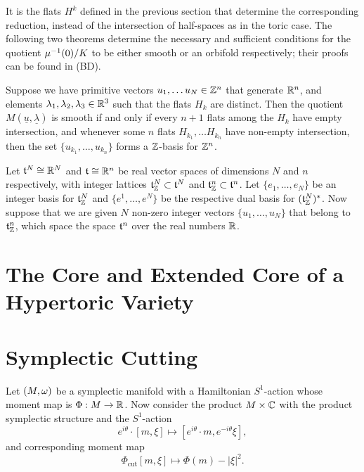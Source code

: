 It is the flats $H^{k}$ defined in the previous section that determine the corresponding \HK reduction, instead of the intersection of half-spaces as in the toric case. The following two theorems determine the necessary and sufficient conditions for the \HK quotient $\mu^{-1}(0)/K$ to be either smooth or an orbifold respectively; their proofs can be found in (BD).

\begin{thm}
	Suppose we have primitive vectors $u_{1},\ldots u_{N} \in \mathbb{Z}^{n}$ that generate $\mathbb{R}^{n}$, and elements $\lambda_{1}, \lambda_{2}, \lambda_{3} \in \mathbb{R}^{3}$ such that the flats $H_{k}$ are distinct. Then the \HK quotient $M(\underline{u},\underline{\lambda})$ is smooth if and only if every $n+1$ flats among the $H_{k}$ have empty intersection, and whenever some $n$ flats $H_{k_{1}}, \ldots H_{k_{n}}$ have non-empty intersection, then the set $\{ u_{k_{1}}, \ldots, u_{k_{n}}  \}$ forms a $\mathbb{Z}$-basis for $\mathbb{Z}^{n}$.
\end{thm}

Let $\mathfrak{t}^{N} \cong \mathbb{R}^{N}$ and $\mathfrak{t} \cong \mathbb{R}^{n}$ be real vector spaces of dimensions $N$ and $n$ respectively, with integer lattices $\mathfrak{t}_{\mathbb{Z}}^{N} \subset \mathfrak{t}^{N}$ and $\mathfrak{t}_{\mathbb{Z}}^{n} \subset \mathfrak{t}^{n}$. Let $\{e_{1},\ldots, e_{N}  \}$ be an integer basis for $\mathfrak{t}_{\mathbb{Z}}^{N}$ and $\{e^{1},\ldots, e^{N}\}$ be the respective dual basis for $(\mathfrak{t}_{\mathbb{Z}}^{N})^{\ast}$. Now suppose that we are given $N$ non-zero integer vectors $\{u_{1},\ldots, u_{N}  \}$ that belong to $\mathfrak{t}_{\mathbb{Z}}^{n}$, which space the space $\mathfrak{t}^{n}$ over the real numbers $\mathbb{R}$.

\section{The Core and Extended Core of a Hypertoric Variety}



\section{Symplectic Cutting}

Let $(M,\omega)$ be a symplectic manifold with a Hamiltonian $S^{1}$-action whose moment map is $\Phi: M \rightarrow \mathbb{R}$. Now consider the product $M \times \mathbb{C}$ with the product symplectic structure and the $S^{1}$-action
\begin{equation*}
	e^{i\theta}\cdot[m,\xi] \longmapsto [ e^{i\theta}\cdot m, e^{-i\theta} \xi ],
\end{equation*}
and corresponding moment map
\begin{equation*}
	\Phi_{\text{cut}}[m, \xi] \longmapsto \Phi(m) - |\xi|^{2}.
\end{equation*}


